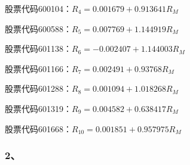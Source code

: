 股票代码600104：$R_{4}=0.001679 + 0.913641R_{M}$

股票代码600588：$R_{5}=0.007769 + 1.144919R_{M}$

股票代码601138：$R_{6}=-0.002407 + 1.144003R_{M}$

股票代码601166：$R_{7}=0.002491 + 0.93768R_{M}$

股票代码601288：$R_{8}=0.001094 + 1.018268R_{M}$

股票代码601319：$R_{9}=0.004582+0.638417R_{M}$

股票代码601668：$R_{10}=0.001851+0.957975R_{M}$


\subsubsection{2、}



